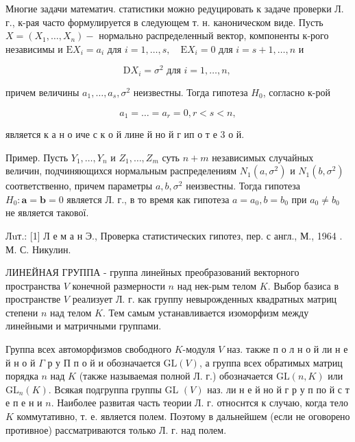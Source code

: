 \documentclass[10pt]{article}
\begin{document}
Многие задачи математич. статистики можно редуцировать к задаче проверки Л. г., к-рая часто формулируется в следующем т. н. каноническом виде. Пусть $X=\left(X_{1}, \ldots, X_{n}\right)-$ нормально распределенный вектор, компоненты к-рого независимы и $\mathrm{E} X_{i}=a_{i}$ для $i=1, \ldots, s, \quad \mathrm{E} X_{i}=0$ для $i=s+1, \ldots, n$ и



\[

\mathrm{D} X_{i}=\sigma^{2} \text { для } i=1, \ldots, n \text {, }

\]



причем величины $a_{1}, \ldots, a_{s}, \sigma^{2}$ неизвестны. Тогда гипотеза $H_{0}$, согласно к-рой



\[

a_{1}=\ldots=a_{r}=0, r<s<n,

\]



является к а н о иче с к о й лине й но й г ип о т е 3 о й.



Пример. Пусть $Y_{1}, \ldots, Y_{n}$ и $Z_{1}, \ldots, Z_{m}$ суть $n+m$ независимых случайных величин, подчиняющихся нормальным распределениям $N_{1}\left(a, \sigma^{2}\right)$ и $N_{1}\left(b, \sigma^{2}\right)$ соответственно, причем параметры $a, b, \sigma^{2}$ неизвестны. Тогда гипотеза $H_{0}: \boldsymbol{a}=\boldsymbol{b}=0$ является Л. г., в то время как гипотеза $a=a_{0}, b=b_{0}$ при $a_{0} \neq b_{0}$ не является такової.



Лuт.: [1] Л е м а н Э., Проверка статистических гипотез, пер. с англ., М., 1964 . М. С. Никулин.



ЛИНЕЙНАЯ ГРУППА - группа линейных преобразований векторного пространства $V$ конечной размерности $n$ над нек-рым телом $K$. Выбор базиса в пространстве $V$ реализует Л. г. как группу невырожденных квадратных матриц степени $n$ над телом $K$. Тем самым устанавливается изоморфизм между линейными и матричными группами.



Группа всех автоморфизмов свободного $K$-модуля $V$ наз. также п о л н о й ли н е й н о й $\Gamma$ р у П п о й и обозначается $\mathrm{GL}(V)$, а группа всех обратимых матриц порядка $n$ над $K$ (также называемая полной Л. г.) обозначается $\mathrm{GL}(n, K)$ или $\mathrm{GL}_{n}(K)$. Всякая подгруппа группы GL $(V)$ наз. ли н е й но й г р у п по й с т е п е н и $n$. Наиболее развитая часть теории Л. г. относнтся к случаю, когда тело $K$ коммутативно, т. е. является полем. Поэтому в дальнейшем (если не оговорено противное) рассматриваются только Л. г. над полем.
\end{document}
